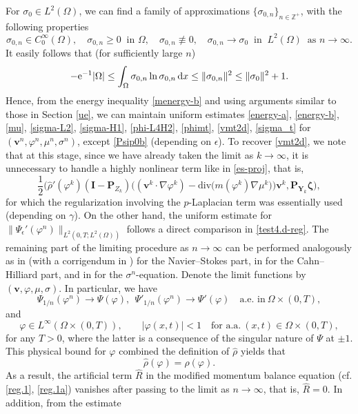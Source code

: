 \documentclass[11pt,reqno]{amsart}
\def\d{{\rm d}}
\def\div{\mathrm{div}}
\def\vv{\bm{v}}
\begin{document}
For $\sigma_0\in L^2(\Omega)$, we can find a family of approximations $\{\sigma_{0,n}\}_{n\in \mathbb{Z}^+}$, with the following properties
$$
\sigma_{0,n} \in C^{\infty}_0(\Omega),  \quad \sigma_{0,n}\ge 0 \ \text { in } \Omega,\quad \sigma_{0,n}\not\equiv 0,\quad
\sigma_{0,n} \rightarrow \sigma_0\ \text { in }\ L^2(\Omega) \ \text { as } n\to \infty.
$$
It easily follows that (for sufficiently large $n$)
\begin{align}
-\mathrm{e}^{-1}|\Omega|\leq \int_\Omega \sigma_{0,n}\ln \sigma_{0,n}\,\d x\leq \|\sigma_{0,n}\|^2 \leq \|\sigma_{0}\|^2 +1.
\label{bd-ini-sigL1}
\end{align}
%
Hence, from the energy inequality \eqref{menergy-b} and using arguments similar to those in Section \ref{ue}, we can maintain uniform estimates \eqref{energy-a}, \eqref{energy-b}, \eqref{mu}, \eqref{sigma-L2}, \eqref{sigma-H1}, \eqref{phi-L4H2}, \eqref{phimt}, \eqref{vmt2d}, \eqref{sigma_t} for $(\bm{v}^{n},\varphi^{n},\mu^{n}, \sigma^{n})$, except \eqref{Psip0b} (depending on $\epsilon$). To recover \eqref{vmt2d}, we note that at this stage, since we have already taken the limit as $k\to \infty$, it is unnecessary to handle a highly nonlinear term like in \eqref{es-proj}, that is,
$$
\frac12\big(\widehat{\rho}'(\varphi^k)(\bm{I}-\bm{P}_{Z_{k}}) \big((\bm{v}^k\cdot\nabla\varphi^k)-\div \big(m(\varphi^k)\nabla \mu^k\big)\big)\vv^k,\bm{P}_{\bm{Y}_{k}}\bm{\zeta}\big),
$$
for which the regularization involving the $p$-Laplacian term was essentially used (depending on $\gamma$). On the other hand, the uniform estimate for $\|\Psi_\epsilon'(\varphi^n)\|_{L^2(0,T; L^2(\Omega))}$ follows a direct comparison in \eqref{test4.d-reg}. The remaining part of the limiting procedure as $n\to \infty$ can be performed analogously as in \cite[Sections 4.2, 4.3]{Frigeri2016} (with a corrigendum in \cite[Remark 4.3]{Frigeri2021}) for the Navier--Stokes part, in \cite{DD95,MT16} for the Cahn--Hilliard part, and in \cite{Lan2016} for the $\sigma^n$-equation. Denote the limit functions by $(\vv,\varphi,\mu,\sigma)$. In particular, we have
 $$
 \Psi_{1/n}(\varphi^n)\to \Psi(\varphi),\ \ \Psi'_{1/n}(\varphi^n)\to \Psi'(\varphi)\quad \text{a.e. in}\ \Omega\times(0,T),
 $$
 and
 $$ \varphi\in L^\infty(\Omega\times(0,T)),\qquad
 |\varphi(x,t)|<1\quad  \text{for a.a.}\ (x,t)\in  \Omega\times (0,T),
 $$
 for any $T>0$, where the latter is a consequence of the singular nature of $\Psi$ at $\pm 1$. This physical bound for $\varphi$ combined the definition of $\widehat{\rho}$ yields that
 $$
 \widehat{\rho}(\varphi)=\rho(\varphi).
 $$
 As a result, the artificial term $\widehat{R}$ in the modified momentum balance equation (cf. \eqref{reg.1}, \eqref{reg.1a}) vanishes after passing to the limit as $n\to \infty$, that is, $\widehat{R}=0$. In addition, from the estimate
\end{document}
